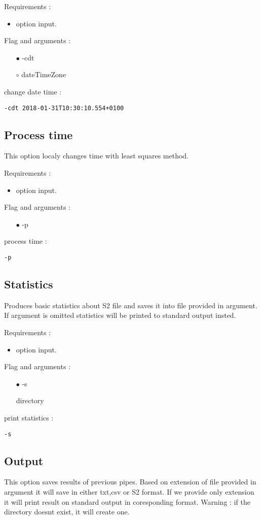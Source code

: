 \documentclass[english]{article}
\begin{document}
\noindent Requirements : 
\begin{itemize}
\item option input. 
\end{itemize}
Flag and arguments :
\begin{itemize}
\item[$\bullet$] -cdt
\item[$\circ$] dateTimeZone
\end{itemize}
change date time : 
\begin{lstlisting} 
-cdt 2018-01-31T10:30:10.554+0100
\end{lstlisting}


\subsection{Process time}
This option localy changes time with least squares method. 

\noindent Requirements : 
\begin{itemize}
\item option input. 
\end{itemize}
Flag and arguments :
\begin{itemize}
\item[$\bullet$] -p
\end{itemize}
process time : 
\begin{lstlisting} 
-p
\end{lstlisting}


\subsection{Statistics}
Produces basic statistics about S2 file and saves it into file provided in argument. If argument is omitted statistics will be printed to standard output insted.

\noindent Requirements : 
\begin{itemize}
\item option input. 
\end{itemize}
Flag and arguments :
\begin{itemize}
\item[$\bullet$] -s
\item[\textasteriskcentered] directory
\end{itemize}
print statistics : 
\begin{lstlisting} 
-s
\end{lstlisting}


\subsection{Output}
This option saves results of previous pipes. Based on extension of file provided in argument it will save in either txt,csv or S2 format. If we provide only extension it will print result on standard output in coresponding format. Warning : if the directory doesnt exist, it will create one.
\end{document}
